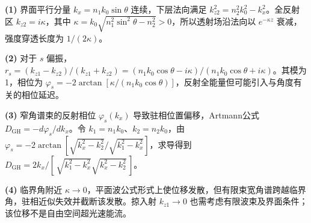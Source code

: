 \par\noindent\textbf{(1)} 界面平行分量 \(k_x=n_1k_0\sin\theta\) 连续，下层法向满足 \(k_{z2}^2=n_2^2k_0^2-k_x^2\)。全反射区 \(k_{z2}=i\kappa\)，其中 \(\kappa=k_0\sqrt{n_1^2\sin^2\theta-n_2^2}>0\)，所以透射场沿法向以 \(e^{-\kappa z}\) 衰减，强度穿透长度为 \(1/(2\kappa)\)。
\par\noindent\textbf{(2)} 对于 \(s\) 偏振，\(r_s=(k_{z1}-k_{z2})/(k_{z1}+k_{z2})=(n_1k_0\cos\theta-i\kappa)/(n_1k_0\cos\theta+i\kappa)\)。其模为1，相位为 \(\varphi_s=-2\arctan[\kappa/(n_1k_0\cos\theta)]\)，反射全能量但可能引入与角度有关的相位延迟。
\par\noindent\textbf{(3)} 窄角谱束的反射相位 \(\varphi_s(k_x)\) 导致驻相位置偏移，Artmann公式 \(D_{\mathrm{GH}}=-d\varphi_s/dk_x\)。令 \(k_1=n_1k_0\)、\(k_2=n_2k_0\)，由 \(\varphi_s=-2\arctan[\sqrt{k_x^2-k_2^2}/\sqrt{k_1^2-k_x^2}]\)，求导得到 \(D_{\mathrm{GH}}=2k_x/[\,\sqrt{k_1^2-k_x^2}\sqrt{k_x^2-k_2^2}\,]\)。
\par\noindent\textbf{(4)} 临界角附近 \(\kappa\to0\)，平面波公式形式上使位移发散，但有限束宽角谱跨越临界角，驻相近似失效并截断该发散。掠入射 \(k_{z1}\to0\) 也需考虑有限波束及界面条件；该位移不是自由空间超光速能流。
